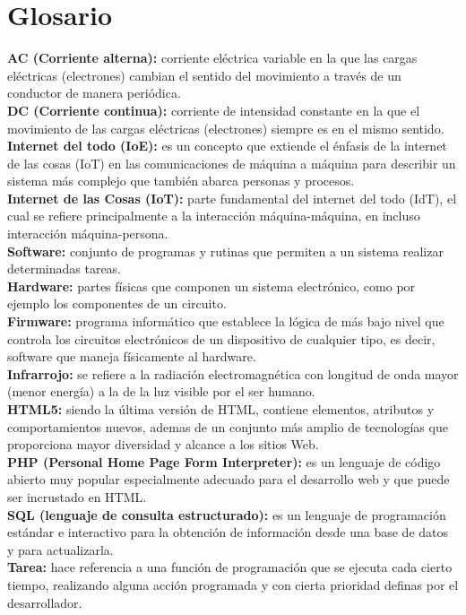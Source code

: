 \chapter*{Glosario}

\textbf{AC (Corriente alterna):} corriente eléctrica variable en la que las cargas eléctricas (electrones) cambian el sentido del movimiento a través de un conductor de manera periódica.\\

\textbf{DC (Corriente continua):} corriente de intensidad constante en la que el movimiento de las cargas eléctricas (electrones) siempre es en el mismo sentido.\\

\textbf{Internet del todo (IoE):} es un concepto que extiende el énfasis de la internet de las cosas (IoT) en las comunicaciones de máquina a máquina para describir un sistema más complejo que también abarca personas y procesos.\cite{IOE} \\

\textbf{Internet de las Cosas (IoT):} parte fundamental del internet del todo (IdT), el cual se refiere principalmente a la interacción máquina-máquina, en incluso interacción máquina-persona.\\

\textbf{Software:} conjunto de programas y rutinas que permiten a un sistema realizar determinadas tareas.\\

\textbf{Hardware:} partes físicas que componen un sistema electrónico, como por ejemplo los componentes de un circuito.\\

\textbf{Firmware:} programa informático que establece la lógica de más bajo nivel que controla los circuitos electrónicos de un dispositivo de cualquier tipo, es decir, software que maneja físicamente al hardware.\\

\textbf{Infrarrojo:} se refiere a la radiación electromagnética con longitud de onda mayor (menor energía) a la de la luz visible por el ser humano.\\

\textbf{HTML5:} siendo la última versión de HTML, contiene elementos, atributos y comportamientos nuevos, ademas de un conjunto más amplio de tecnologías que proporciona mayor diversidad y alcance a los sitios Web. \\

\textbf{PHP (Personal Home Page Form Interpreter):} es un lenguaje de código abierto muy popular especialmente adecuado para el desarrollo web y que puede ser incrustado en HTML.\\

\textbf{SQL (lenguaje de consulta estructurado):} es un lenguaje de programación estándar e interactivo para la obtención de información desde una base de datos y para actualizarla.\\

\textbf{Tarea:} hace referencia a una función de programación que se ejecuta cada cierto tiempo, realizando alguna acción programada y con cierta prioridad definas por el desarrollador.